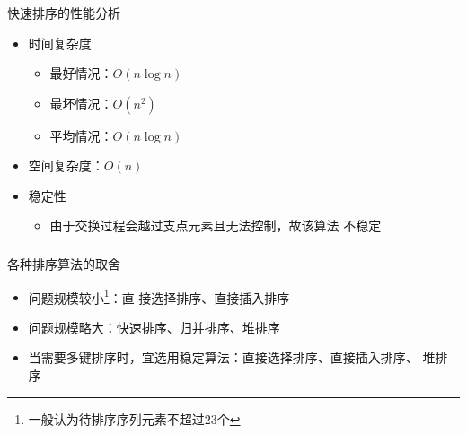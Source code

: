 \begin{frame}
    \frametitle{\insertsectionhead}
    \begin{block}{快速排序的性能分析}
        \begin{itemize}
            \item 时间复杂度
                  \begin{itemize}
                      \item 最好情况：$O(n\log n)$
                      \item 最坏情况：$O(n^{2})$
                      \item 平均情况：$O(n\log n)$
                  \end{itemize}
            \item 空间复杂度：$O(n)$
            \item 稳定性
                  \begin{itemize}
                      \item 由于交换过程会越过支点元素且无法控制，故该算法
                            \alert{不稳定}
                  \end{itemize}
        \end{itemize}
    \end{block}
\end{frame}

\begin{frame}
    \frametitle{\insertsectionhead}
    \begin{alertblock}{各种排序算法的取舍}
        \begin{itemize}
            \item 问题规模较小\footnote{一般认为待排序序列元素不超过$23$个}：直
                  接选择排序、直接插入排序
            \item 问题规模略大：快速排序、归并排序、堆排序
            \item 当需要多键排序时，宜选用稳定算法：直接选择排序、直接插入排序、
                  堆排序
        \end{itemize}
    \end{alertblock}
\end{frame}
